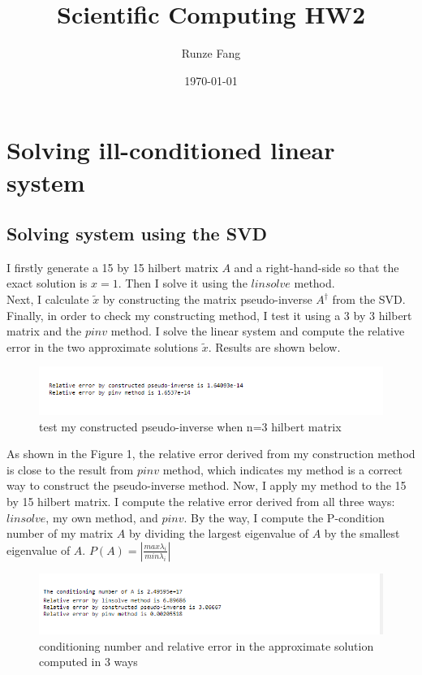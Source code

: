\documentclass[a4paper]{article}
\title{Scientific Computing HW2}
\author{Runze Fang}
\date{\today}
\begin{document}
\maketitle
\section{Solving ill-conditioned linear system}
\subsection{Solving system using the SVD}
I firstly generate a 15 by 15 hilbert matrix $A$ and a right-hand-side so that the exact solution is $x=1$. Then I solve it using the $linsolve$ method.\\
\indent Next, I calculate $\tilde{x}$ by constructing the matrix pseudo-inverse $A^{\dagger}$ from the SVD.\\
\indent Finally, in order to check my constructing method, I test it using a 3 by 3 hilbert matrix and the $pinv$ method. I solve the linear system and compute the relative error in the two approximate solutions $\tilde{x}$. Results are shown below.

\begin{figure}[H] 
\centering 
\includegraphics[width=1.0\textwidth]{1.1-1.png}
\caption{test my constructed pseudo-inverse when n=3 hilbert matrix} 
\label{Fig.1.1-1} 
\end{figure}

As shown in the Figure 1, the relative error derived from my construction method is close to the result from $pinv$ method, which indicates my method is a correct way to construct the pseudo-inverse method. Now, I apply my method to the 15 by 15 hilbert matrix. I compute the relative error derived from all three ways: $linsolve$, my own method, and $pinv$. By the way, I compute the P-condition number of my matrix $A$ by dividing the largest eigenvalue of $A$ by the smallest eigenvalue of $A$. $P(A)=|\frac{max\lambda_i}{min\lambda_i}|$ 

\begin{figure}[H] 
\centering 
\includegraphics[width=1.0\textwidth]{1.1-2.png}
\caption{conditioning number and relative error in the approximate solution computed in 3 ways} 
\label{Fig.1.1-2} 
\end{figure}
\end{document}
